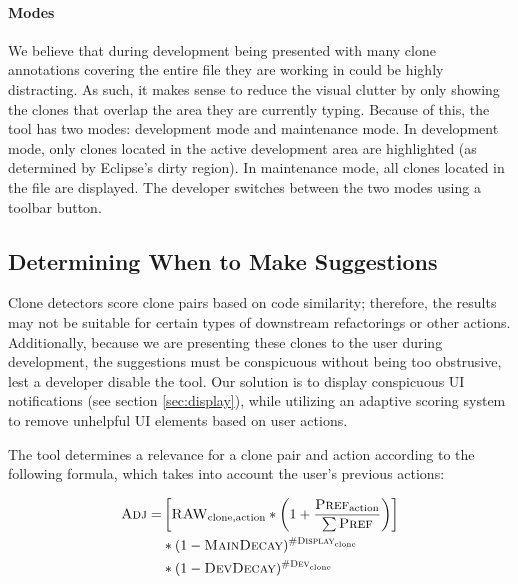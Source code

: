 \documentclass[nocopyrightspace,10pt]{sigplanconf}
\begin{document}
\paragraph{Modes}
We believe that during development being presented with many 
clone annotations covering the entire file they are working in 
could be highly distracting.  As such, it makes sense to reduce the visual clutter
by only showing the clones that overlap the area they are currently typing.
Because of this, the tool has two modes: development mode and maintenance mode. In
development mode, only clones located in the active development area
are highlighted (as determined by Eclipse's dirty region). In
maintenance mode, all clones located in the file are displayed. The
developer switches between the two modes using a toolbar button.

\subsection{Determining When to Make Suggestions}

Clone detectors score clone pairs based on code similarity; therefore,
the results may not be suitable for certain types of downstream
refactorings or other actions.
Additionally,
because we are presenting these clones to the user during development,
the suggestions must be conspicuous without being too obstrusive, lest
a developer disable the tool.
Our solution is to display conspicuous UI notifications
(see section \ref{sec:display}), while utilizing an 
adaptive scoring system to remove unhelpful UI elements based
on user actions.  

The tool determines a relevance for a clone pair and action according
to the following formula, which takes into account the user's previous
actions:

\begin{align*}
  \textsc{Adj} = & \left[ \textsc{RAW}_{\text{clone},\text{action}} * \left(1 + \frac{\textsc{Pref}_{\text{action}}}{\sum{\textsc{Pref}}}\right) \right] \\
      & * (1-\textsc{MainDecay})^{\textsc{\#Display}_{\text{clone}}} \\
      & * (1-\textsc{DevDecay})^{\textsc{\#Dev}_{\text{clone}}} 
\end{align*}
\end{document}
